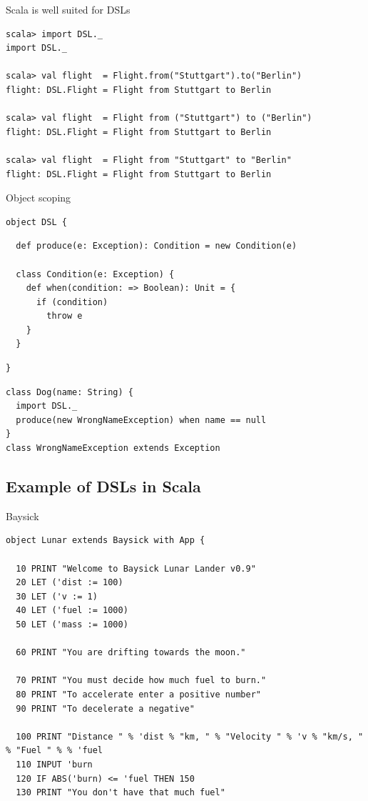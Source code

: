 \begin{frame}[fragile]{Scala is well suited for DSLs}
\begin{lstlisting}
scala> import DSL._
import DSL._

scala> val flight  = Flight.from("Stuttgart").to("Berlin")
flight: DSL.Flight = Flight from Stuttgart to Berlin

scala> val flight  = Flight from ("Stuttgart") to ("Berlin")
flight: DSL.Flight = Flight from Stuttgart to Berlin

scala> val flight  = Flight from "Stuttgart" to "Berlin"
flight: DSL.Flight = Flight from Stuttgart to Berlin
\end{lstlisting}
\end{frame}

\begin{frame}[fragile]{Object scoping}
\begin{lstlisting}
object DSL {
\end{lstlisting}
\begin{lstlisting}
  def produce(e: Exception): Condition = new Condition(e)

  class Condition(e: Exception) {
    def when(condition: => Boolean): Unit = {
      if (condition)
        throw e
    }
  }
\end{lstlisting}
\begin{lstlisting}
}
\end{lstlisting}
\begin{lstlisting}
class Dog(name: String) {
  import DSL._
  produce(new WrongNameException) when name == null
}
class WrongNameException extends Exception
\end{lstlisting}
\end{frame}

\subsection{Example of DSLs in Scala}
\begin{frame}[fragile]{Baysick}
\begin{lstlisting}
object Lunar extends Baysick with App {

  10 PRINT "Welcome to Baysick Lunar Lander v0.9"
  20 LET ('dist := 100)
  30 LET ('v := 1)
  40 LET ('fuel := 1000)
  50 LET ('mass := 1000)

  60 PRINT "You are drifting towards the moon."

  70 PRINT "You must decide how much fuel to burn."
  80 PRINT "To accelerate enter a positive number"
  90 PRINT "To decelerate a negative"

  100 PRINT "Distance " % 'dist % "km, " % "Velocity " % 'v % "km/s, " % "Fuel " % % 'fuel
  110 INPUT 'burn
  120 IF ABS('burn) <= 'fuel THEN 150
  130 PRINT "You don't have that much fuel"
\end{lstlisting}
\end{frame}

